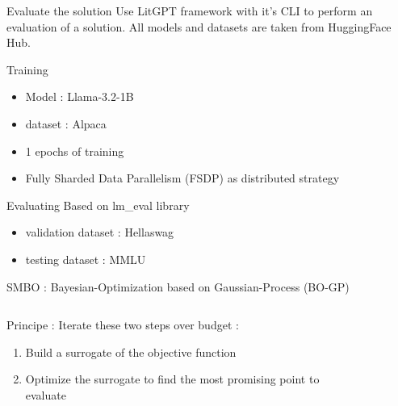\begin{frame}{Evaluate the solution}
    Use LitGPT framework with it's CLI to perform an evaluation of a solution. All models and datasets are taken from HuggingFace Hub.
    \begin{block}{Training}
        \begin{itemize}
            \item Model : Llama-3.2-1B
            \item dataset : Alpaca
            \item 1 epochs of training
            \item Fully Sharded Data Parallelism (FSDP) as distributed strategy
        \end{itemize}
    \end{block}

    \begin{block}{Evaluating}
        Based on lm\_eval library
        \begin{itemize}
            \item validation dataset : Hellaswag
            \item testing dataset : MMLU
        \end{itemize}
    \end{block}

    
\end{frame}

\begin{frame}{SMBO : Bayesian-Optimization based on Gaussian-Process (BO-GP)}
    \begin{columns}
        \begin{column}{0.4\textwidth}

            \begin{block}{Principe :}
                Iterate these two steps over budget : 
                \begin{enumerate}
                    \item Build a surrogate of the objective function
                    \item Optimize the surrogate to find the most promising point to evaluate
                \end{enumerate}
                
                
            \end{block}
            
        \end{column}        
        \begin{column}{0.5\textwidth}
            \begin{figure}
                \centering
                
            \end{figure}
        \end{column}
    \end{columns}
    
\end{frame}

